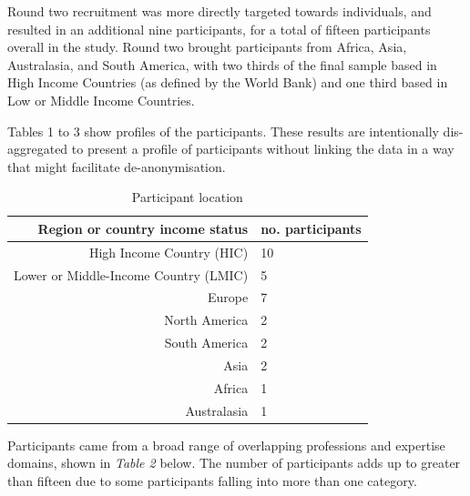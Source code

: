 \documentclass{CUP-JNL-DAP}%
\begin{document}
Round two recruitment was more directly targeted towards individuals, and resulted in an additional nine participants, for a total of fifteen participants overall in the study. Round two brought participants from Africa, Asia, Australasia, and South America, with two thirds of the final sample based in High Income Countries (as defined by the World Bank) and one third based in Low or Middle Income Countries. 

Tables 1 to 3 show profiles of the participants. These results are intentionally dis-aggregated to present a profile of participants without linking the data in a way that might facilitate de-anonymisation.

\begin{table}[ht!]
  \begin{center}
    \caption{Participant location}
    \label{tab:locations}
    \begin{tabular}{r|l} %
      \textbf{Region or country income status} & \textbf{no. participants} \\
      \hline
        High Income Country (HIC)&10\\
        Lower or Middle-Income Country (LMIC) &5 \\
        \hline
        Europe&7\\
        North America&2\\
        South America&2\\
        Asia&2\\
        Africa&1\\
        Australasia&1\\
    \end{tabular}
  \end{center}
\end{table}

Participants came from a broad range of overlapping professions and expertise domains, shown in \textit{Table 2} below.  The number of participants adds up to greater than fifteen due to some participants falling into more than one category.  
\end{document}
